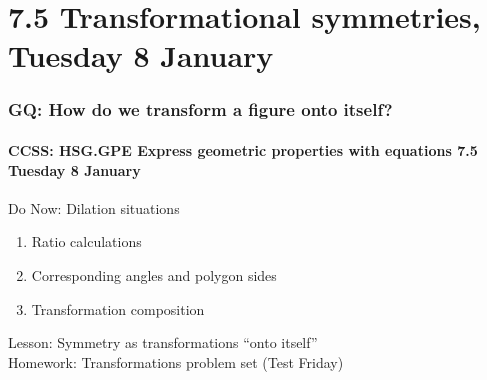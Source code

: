 \documentclass{beamer}
\begin{document}
\section{7.5 Transformational symmetries, Tuesday 8 January}
\frame
{
  \frametitle{GQ: How do we transform a figure onto itself?}
  \framesubtitle{CCSS: HSG.GPE Express geometric properties with equations \hfill \alert{7.5 Tuesday 8 January}}

  \begin{block}{Do Now: Dilation situations}
  \begin{enumerate}
    \item Ratio calculations
    \item Corresponding angles and polygon sides
    \item Transformation composition
  \end{enumerate}
  \end{block}
  Lesson: Symmetry as transformations ``onto itself'' \\[0.5cm]
  Homework: Transformations problem set (\alert{Test Friday})
}
\end{document}

